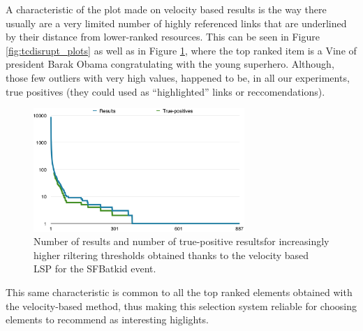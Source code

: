 \documentclass{sig-alternate}
\begin{document}
A characteristic of the plot made on velocity based results is the way there usually are a very limited number of highly referenced links that are underlined by their distance from lower-ranked resources. This can be seen in Figure \ref{fig:tcdisrupt_plots} as well as in Figure \ref{fig:sfbatkid_plot}, where the top ranked item is a Vine of president Barak Obama congratulating with the young superhero. Although, those few outliers with very high values, happened to be, in all our experiments, true positives (they could used as ``highlighted'' links or reccomendations).
\begin{figure}[htbp]
  \centering
  \includegraphics[width=8cm]{Figures/batkid_plot.png}
  \caption{Number of results and number of true-positive resultsfor increasingly higher riltering thresholds obtained thanks to the velocity based LSP for the SFBatkid event.}
  \label{fig:sfbatkid_plot}
\end{figure}
This same characteristic is common to all the top ranked elements obtained with the velocity-based method, thus making this selection system reliable for choosing elements to recommend as interesting higlights.
\end{document}
